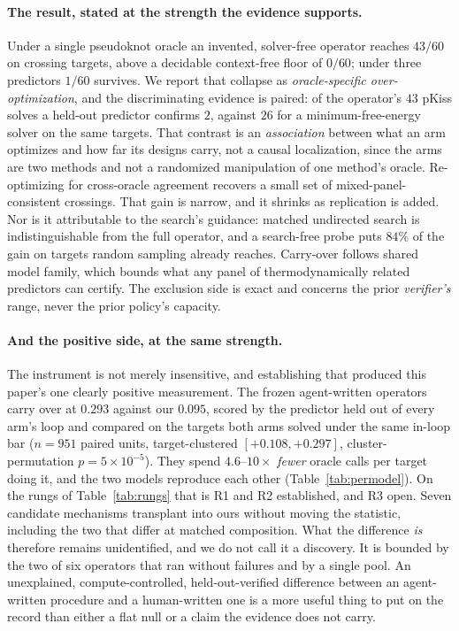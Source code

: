 \documentclass[11pt]{article}
\begin{document}
\paragraph{The result, stated at the strength the evidence supports.} Under a single pseudoknot oracle an
invented, solver-free operator reaches $43/60$ on crossing targets, above a decidable context-free floor of
$0/60$; under three predictors $1/60$ survives. We report that collapse as \emph{oracle-specific
over-optimization}, and the discriminating evidence is paired: of the operator's $43$ pKiss solves a held-out
predictor confirms $2$, against $26$ for a minimum-free-energy solver on the same targets. That contrast is an
\emph{association} between what an arm optimizes and how far its designs carry, not a causal localization,
since the arms are two methods and not a randomized manipulation of one method's oracle. Re-optimizing for cross-oracle agreement recovers a small set of mixed-panel-consistent crossings. That gain is
narrow, and it shrinks as replication is added. Nor is it attributable to the search's guidance: matched
undirected search is indistinguishable from the full operator, and a search-free probe puts $84\%$ of the gain
on targets random sampling already reaches. Carry-over follows shared model family, which bounds what any panel of
thermodynamically related predictors can certify. The exclusion side is exact and concerns the prior
\emph{verifier's} range, never the prior policy's capacity.

\paragraph{And the positive side, at the same strength.} The instrument is not merely insensitive, and
establishing that produced this paper's one clearly positive measurement. The frozen agent-written operators carry over at $0.293$ against our $0.095$, scored by the predictor held out
of every arm's loop and compared on the targets both arms solved under the same in-loop bar ($n{=}951$ paired
units, target-clustered $[{+}0.108,{+}0.297]$, cluster-permutation $p{=}5\!\times\!10^{-5}$). They spend
$4.6$--$10\times$ \emph{fewer} oracle calls per target doing it, and the two models reproduce each other
(Table~\ref{tab:permodel}). On the rungs of Table~\ref{tab:rungs} that is R1 and R2 established, and R3 open. Seven candidate mechanisms
transplant into ours without moving the statistic, including the two that differ at matched composition. What
the difference \emph{is} therefore remains unidentified, and we do not call it a discovery. It is bounded by the two of six operators that ran without failures and by
a single pool. An unexplained, compute-controlled, held-out-verified difference between an agent-written
procedure and a human-written one is a more useful thing to put on the record than either a flat null or a
claim the evidence does not carry.
\end{document}

